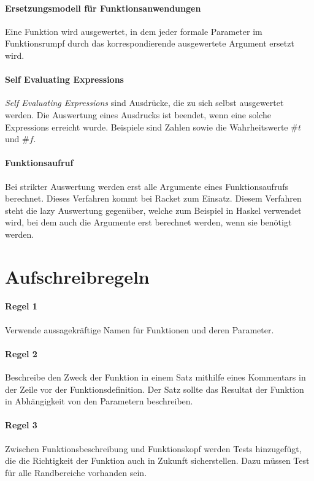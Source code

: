 \documentclass[../main.tex]{subfiles}
\begin{document}
        \paragraph{Ersetzungsmodell für Funktionsanwendungen}
		\label{section:Programmierung:Auswertungsregeln:ErsetzungsmodellFunktionsanwendungen}
			Eine Funktion wird ausgewertet, in dem jeder formale Parameter im Funktionsrumpf durch das korrespondierende ausgewertete Argument ersetzt wird.
            
        \paragraph{Self Evaluating Expressions}
            \emph{Self Evaluating Expressions} sind Ausdrücke, die zu sich selbst ausgewertet werden. Die Auswertung eines Ausdrucks ist beendet, wenn eine solche Expressions erreicht wurde. Beispiele sind Zahlen sowie die Wahrheitswerte $\#t$ und $\#f$.
            
        \paragraph{Funktionsaufruf}
            Bei strikter Auswertung werden erst alle Argumente eines Funktionsaufrufs berechnet. Dieses Verfahren kommt bei Racket zum Einsatz. Diesem Verfahren steht die lazy Auswertung gegenüber, welche zum Beispiel in Haskel verwendet wird, bei dem auch die Argumente erst berechnet werden, wenn sie benötigt werden.   
            
    \section{Aufschreibregeln}
        \paragraph{Regel 1}
            Verwende aussagekräftige Namen für Funktionen und deren Parameter.
        
        \paragraph{Regel 2}
            Beschreibe den Zweck der Funktion in einem Satz mithilfe eines Kommentars in der Zeile vor der Funktionsdefinition. Der Satz sollte das Resultat der Funktion in Abhängigkeit von den Parametern beschreiben.
            
        \paragraph{Regel 3}
            Zwischen Funktionsbeschreibung und Funktionskopf werden Tests hinzugefügt, die die Richtigkeit der Funktion auch in Zukunft sicherstellen. Dazu müssen Test für alle Randbereiche vorhanden sein.
            
\end{document}
